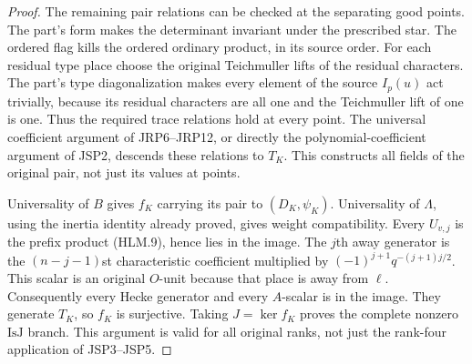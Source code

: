 \begin{proof}
The remaining pair relations can be checked at the separating
good points.  The part's form makes the determinant invariant
under the prescribed star.  The ordered flag kills the ordered
ordinary product, in its source order.  For each residual type
place choose the original Teichmuller lifts of the residual
characters.  The part's type diagonalization makes every
element of the source \(I_p(u)\) act trivially, because its
residual characters are all one and the Teichmuller lift of one
is one.  Thus the required trace relations hold at every point.
The universal coefficient argument of JRP6--JRP12, or directly
the polynomial-coefficient argument of JSP2, descends these
relations to \(T_K\).  This constructs all fields of the
original pair, not just its values at points.

Universality of \(B\) gives \(f_K\) carrying its pair to
\((D_K,\psi_K)\).  Universality of \(\Lambda\), using the
inertia identity already proved, gives weight compatibility.
Every \(U_{v,j}\) is the prefix product (HLM.9), hence lies
in the image.  The \(j\)th away generator is the
\((n-j-1)\)st characteristic coefficient multiplied by
\((-1)^{j+1}q^{-(j+1)j/2}\).  This scalar is an original
\(O\)-unit because that place is away from \(\ell\).
Consequently every Hecke generator and every \(A\)-scalar
is in the image.  They generate \(T_K\), so \(f_K\) is
surjective.  Taking \(J=\ker f_K\) proves the complete
nonzero \(\mathrm{IsJ}\) branch.  This argument is valid
for all original ranks, not just the rank-four application
of JSP3--JSP5.
\end{proof}

